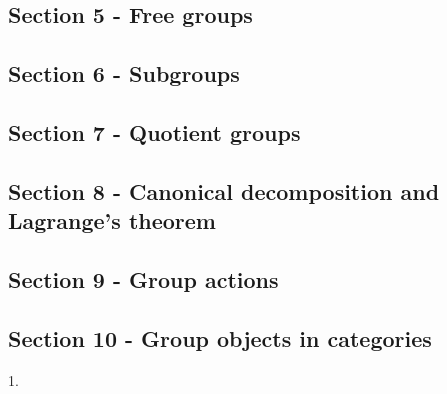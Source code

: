 \documentclass[letterpaper,12pt]{article}
\theoremstyle{definition}
\begin{document}
\subsection*{Section 5 - Free groups}
\subsection*{Section 6 - Subgroups}
\subsection*{Section 7 - Quotient groups}
\subsection*{Section 8 - Canonical decomposition and Lagrange's theorem}
\subsection*{Section 9 - Group actions}
\subsection*{Section 10 - Group objects in categories}


\begin{flushleft}
	1.
\end{flushleft}
\end{document}
